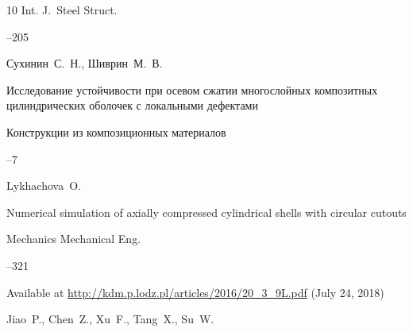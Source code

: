 \begin{thebibliography}{10}
\jour Int. J.~Steel Struct.




–205






\by Сухинин~С.~Н., Шиврин~М.~В.

\paper Исследование устойчивости при осевом сжатии многослойных композитных цилиндрических оболочек с локальными дефектами

\jour Конструкции из композиционных материалов



--7













\by Lykhachova~O.

\paper Numerical simulation of axially compressed cylindrical shells with circular cutouts

\jour Mechanics Mechanical Eng.




--321

\elink Available at \url{http://kdm.p.lodz.pl/articles/2016/20_3_9L.pdf} (July 24, 2018)






\by Jiao~P., Chen~Z., Xu~F., Tang~X., Su~W.


\end{thebibliography}
